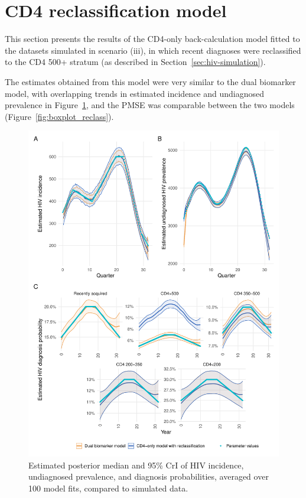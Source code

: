 \section{CD4 reclassification model}\label{appendix:naivereclassify}

This section presents the results of the CD4-only back-calculation model fitted to the datasets simulated in scenario (iii), in which recent diagnoses were reclassified to the CD4 500+ stratum (as described in Section~\ref{sec:hiv-simulation}).

The estimates obtained from this model were very similar to the dual biomarker model, with overlapping trends in estimated incidence and undiagnosed prevalence in Figure~\ref{fig:sim_estimates_reclass}, and the PMSE was comparable between the two models (Figure~\ref{fig:boxplot_reclass}).

\begin{figure}
  \centering
  \includegraphics[width=\textwidth]{sim_estimates_reclass.pdf}
  \caption[Estimated posterior median and 95\% CrI of HIV incidence, undiagnosed prevalence, and diagnosis probabilities]{Estimated posterior median and 95\% CrI of HIV incidence, undiagnosed prevalence, and diagnosis probabilities, averaged over 100 model fits, compared to simulated data.}\label{fig:sim_estimates_reclass}
\end{figure}

